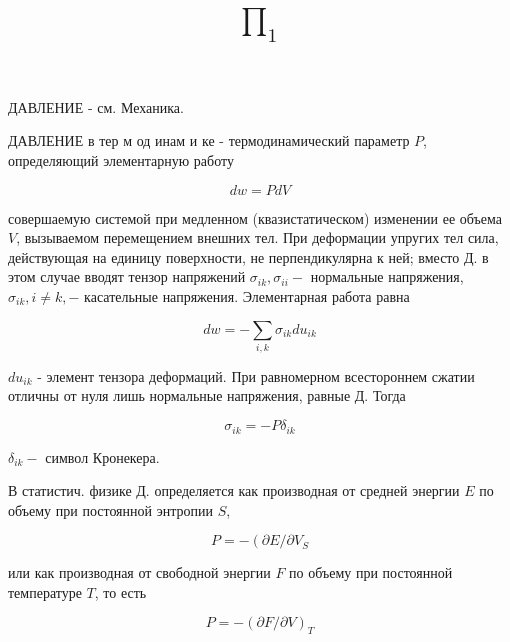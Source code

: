 \documentclass[10pt]{article}
\title{$\prod_{1}$ }
\author{}
\date{}
\begin{document}
\maketitle

ДАВЛЕНИЕ - см. Механика.



ДАВЛЕНИЕ в тер м од инам и ке - термодинамический параметр $P$, определяющий элементарную работу



\[

d w=P d V

\]



совершаемую системой при медленном (квазистатическом) изменении ее объема $V$, вызываемом перемещением внешних тел. При деформации упругих тел сила, действующая на единицу поверхности, не перпендикулярна к ней; вместо Д. в этом случае вводят тензор напряжений $\sigma_{i k}, \sigma_{i i}-$ нормальные напряжения, $\sigma_{i k}, i \neq k,-$ касательные напряжения. Элементарная работа равна



\[

d w=-\sum_{i, k} \sigma_{i k} d u_{i k}

\]



$d u_{i k}$ - элемент тензора деформаций. При равномерном всестороннем сжатии отличны от нуля лишь нормальные напряжения, равные Д. Тогда



\[

\sigma_{i k}=-P \delta_{i k}

\]



$\delta_{i k}-$ символ Кронекера.



В статистич. физике Д. определяется как производная от средней энергии $E$ по объему при постоянной энтропии $S$,



\[

P=-\left(\partial E / \partial V_{S}\right.

\]



или как производная от свободной энергии $F$ по объему при постоянной температуре $T$, то есть



\[

P=-(\partial F / \partial V)_{T}

\]
\end{document}
